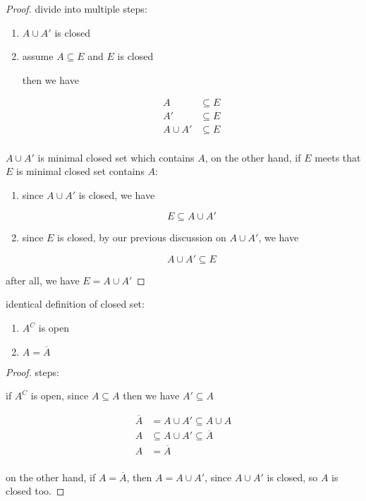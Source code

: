 \documentclass[11pt,a4paper]{book}
\begin{document}
\begin{proof} 

divide into multiple steps:

    \begin{enumerate}
        \item $A \cup A'$ is closed

        \item assume $A \subseteq E$ and $E$ is closed

        then we have 

        \begin{align*}
            A & \subseteq E \\
            A' & \subseteq E \\
            A \cup A' & \subseteq E \\
        \end{align*}
    \end{enumerate}  

$A \cup A'$ is minimal closed set which contains $A$, on the other hand, 
if $E$ meets that $E$ is minimal closed set contains $A$:

\begin{enumerate}
    \item since $A \cup A'$ is closed, we have

    \[
        E \subseteq A \cup A'
    \]

    \item since $E$ is closed, by our previous discussion on $A \cup A'$, we have

    \[
        A \cup A' \subseteq E
    \]
\end{enumerate}

after all, we have $E = A \cup A'$


\end{proof}

\begin{lem}
    identical definition of closed set:

    \begin{enumerate}
        \item $A^C$ is open
        \item $A = \overline{A}$
    \end{enumerate}
\end{lem}

\begin{proof}
steps:

if $A^C$ is open, since $A \subseteq A$ then we have $A' \subseteq A$

\begin{align*}
    \overline{A} &= A \cup A' \subseteq A \cup A \\
    A & \subseteq A \cup A' \subseteq \overline{A} \\
    A &= \overline{A} \\
\end{align*}

on the other hand, if $A = \overline{A}$, then $A = A \cup A'$, since $A \cup A'$ is closed, so $A$ is closed too.

\end{proof}
\end{document}
